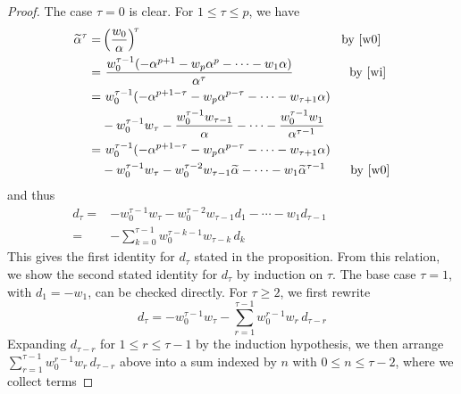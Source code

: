 \documentclass{gtpart}
\theoremstyle{definition}
\theoremstyle{remark}
\newcommand{\A}{\alpha}
\newcommand{\T}{\tau}
\renewcommand{\=}{\approx}
\renewcommand{\-}{\sim}
\numberwithin{equation}{section}
\begin{document}
\begin{proof}
 The case $\T = 0$ is clear.  For $1 \leq \T \leq p$, we have 
 \begin{equation*}
  \begin{split}
   \widetilde{\A}^\T = & \left( \frac{w_0}{\A} \right)^{\!\T} 
                         \qquad\qquad\qquad\qquad\qquad\qquad\qquad\qquad 
                         \text{by \eqref{w0}} \\
                     = & ~ \frac{w_0^{\T - 1} (-\A^{p + 1} - w_p \A^p - \cdots 
                         - w_1 \A)}{\A^\T} 
                         \qquad\qquad~\, \text{by \eqref{wi}} \\
                     = & ~ w_0^{\T - 1} (-\A^{p + 1 - \T} - w_p \A^{p - \T} 
                         - \cdots - w_{\T + 1} \A) \\
                       & - w_0^{\T - 1} w_\T 
                         - \frac{w_0^{\T - 1} w_{\T - 1}}{\A} - \cdots 
                         - \frac{w_0^{\T - 1} w_1}{\A^{\T - 1}} \\
                     = & ~ w_0^{\T - 1} (-\A^{p + 1 - \T} - w_p \A^{p - \T} 
                         - \cdots - w_{\T + 1} \A) \\
                       & - w_0^{\T - 1} w_\T 
                         - w_0^{\T - 2} w_{\T - 1} \widetilde{\A} - \cdots 
                         - w_1 \widetilde{\A}^{\T - 1} 
                         \quad~~~ \text{by \eqref{w0}} 
  \end{split}
 \end{equation*}
 and thus 
 \begin{equation*}
  \begin{split}
   d_\T = & -w_0^{\T - 1} w_\T - w_0^{\T - 2} w_{\T - 1} d_1 - \cdots 
            - w_1 d_{\T - 1} \qquad\qquad\quad~ \\
        = & -\sum_{k = 0}^{\T - 1} w_0^{\T - k - 1} w_{\T - k} \, d_k 
  \end{split}
 \end{equation*}
 This gives the first identity for $d_\T$ stated in the proposition.  From this 
 relation, we show the second stated identity for $d_\T$ by induction on $\T$.  
 The base case $\T = 1$, with $d_1 = -w_1$, can be checked directly.  For 
 $\T \geq 2$, we first rewrite 
 \[
  d_\T = -w_0^{\T - 1} w_\T - \sum_{r = 1}^{\T - 1} 
  w_0^{r - 1} w_r \, d_{\T - r} 
 \]
 Expanding $d_{\T - r}$ for $1 \leq r \leq \T - 1$ by the induction hypothesis, 
 we then arrange $\sum_{r = 1}^{\T - 1} w_0^{r - 1} w_r \, d_{\T - r}$ above 
 into a sum indexed by $n$ with $0 \leq n \leq \T - 2$, where we collect terms 

\end{proof}
\end{document}
